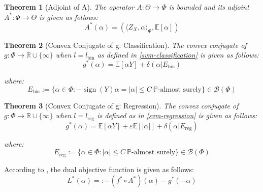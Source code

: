 \documentclass{article}
\newtheorem{theorem}{Theorem}
\begin{document}
\begin{theorem}[Adjoint of A]\label{thm:adjoint-A}
The operator $A :\Theta \rightarrow \Phi$ is bounded and its adjoint $A^{*}: \Phi \rightarrow \Theta$ is given as follows: 
\begin{equation}
A^{*}(\alpha) = (\langle Z_X , \alpha \rangle_{\Phi} , \mathbb{E}[\alpha])
\end{equation} 
\end{theorem}

\begin{theorem}[Convex Conjugate of g: Classification] \label{thm:convex-conj-G-class}
The convex conjugate of $g :\Phi \rightarrow \mathbb{R} \cup \{ \infty\}$ when $l = l_{\text{bin}}$ as defined in \ref{svm-classification} is given as follows:
\begin{equation}\label{classification-convex-dual}
g^{*}(\alpha) = \mathbb{E}[\alpha Y] + \delta(\alpha | E_{\text{bin}})
\end{equation} 

where:
\begin{equation}\label{classification-condition} 
E_{\text{bin}} := \{\alpha \in \Phi : -\operatorname{sign}(Y) \alpha = |\alpha | \leq C \ \mathbb{P}\text{-almost surely}\} \in \mathcal{B}(\Phi)
\end{equation} 
\end{theorem}

\begin{theorem}[Convex Conjugate of g: Regression]\label{thm:convex-conj-G-reg}
The convex conjugate of $g :\Phi \rightarrow \mathbb{R} \cup \{ \infty\}$ when $l = l_{\text{reg}}$ is defined as in \ref{svm-regression} is given as follows:
\begin{equation}\label{regression-convex-dual}
g^{*}(\alpha) = \mathbb{E}[\alpha Y ] + \varepsilon \mathbb{E}[|\alpha|] + \delta(\alpha | E_{\text{reg}})
\end{equation} 

where: 
\begin{equation}\label{regression-condition} 
E_{\text{reg}} := \{\alpha \in \Phi : |\alpha | \leq C \ \mathbb{P}\text{-almost surely}\} \in \mathcal{B}(\Phi)
\end{equation}
\end{theorem}

According to \cite[Theorem 4.4.2]{Borwein2005-ky}, the dual objective function is given as follows:
\begin{equation}
L^{*}(\alpha) =: - (f^{*} \circ A^{*})(\alpha) - g^{*}(-\alpha)
\end{equation}
\end{document}
